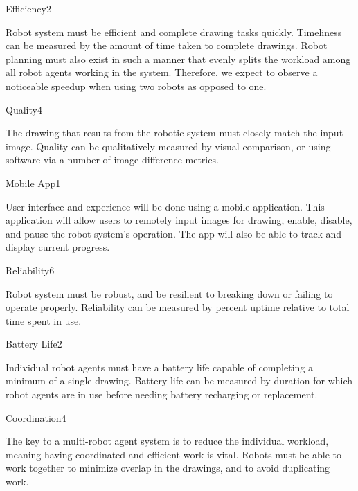 \begin{nonfunctional_requirement}{Efficiency}{2}
\item Robot system must be efficient and complete drawing tasks quickly. Timeliness can be measured by the amount of time taken to complete drawings. Robot planning must also exist in such a manner that evenly splits the workload among all robot agents working in the system. Therefore, we expect to observe a noticeable speedup when using two robots as opposed to one. 
\end{nonfunctional_requirement}

\begin{nonfunctional_requirement}{Quality}{4}
\item The drawing that results from the robotic system must closely match the input image. Quality can be qualitatively measured by visual comparison, or using software via a number of image difference metrics.
\end{nonfunctional_requirement}

\begin{nonfunctional_requirement}{Mobile App}{1}
\item User interface and experience will be done using a mobile application. This application will allow users to remotely input images for drawing, enable, disable, and pause the robot system's operation. The app will also be able to track and display current progress.
\end{nonfunctional_requirement}

\begin{nonfunctional_requirement}{Reliability}{6}
\item Robot system must be robust, and be resilient to breaking down or failing to operate properly. Reliability can be measured by percent uptime relative to total time spent in use.
\end{nonfunctional_requirement}

\begin{nonfunctional_requirement}{Battery Life}{2}
\item Individual robot agents must have a battery life capable of completing a minimum of a single drawing. Battery life can be measured by duration for which robot agents are in use before needing battery recharging or replacement.
\end{nonfunctional_requirement}

\begin{nonfunctional_requirement}{Coordination}{4}
\item The key to a multi-robot agent system is to reduce the individual workload, meaning having coordinated and efficient work is vital. Robots must be able to work together to minimize overlap in the drawings, and to avoid duplicating work.
\end{nonfunctional_requirement}

\begin{comment}
\end{comment}
